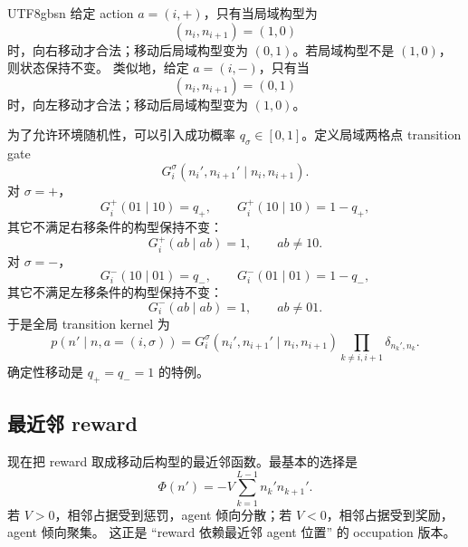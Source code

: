 \documentclass[11pt]{article}
\begin{document}
\begin{CJK*}{UTF8}{gbsn}
给定 action \(a=(i,+)\)，只有当局域构型为
\begin{equation}
    (n_i,n_{i+1})=(1,0)
\end{equation}
时，向右移动才合法；移动后局域构型变为 \((0,1)\)。若局域构型不是 \((1,0)\)，则状态保持不变。
类似地，给定 \(a=(i,-)\)，只有当
\begin{equation}
    (n_i,n_{i+1})=(0,1)
\end{equation}
时，向左移动才合法；移动后局域构型变为 \((1,0)\)。

为了允许环境随机性，可以引入成功概率 \(q_\sigma\in[0,1]\)。定义局域两格点 transition gate
\begin{equation}
    G_i^\sigma(n_i',n_{i+1}'\mid n_i,n_{i+1}).
\end{equation}
对 \(\sigma=+\)，
\begin{equation}
    G_i^+(01\mid 10)=q_+,
    \qquad
    G_i^+(10\mid 10)=1-q_+,
\end{equation}
其它不满足右移条件的构型保持不变：
\begin{equation}
    G_i^+(ab\mid ab)=1,
    \qquad
    ab\neq 10.
\end{equation}
对 \(\sigma=-\)，
\begin{equation}
    G_i^-(10\mid 01)=q_-,
    \qquad
    G_i^-(01\mid 01)=1-q_-,
\end{equation}
其它不满足左移条件的构型保持不变：
\begin{equation}
    G_i^-(ab\mid ab)=1,
    \qquad
    ab\neq 01.
\end{equation}
于是全局 transition kernel 为
\begin{equation}
    p(n'\mid n,a=(i,\sigma))
    =
    G_i^\sigma(n_i',n_{i+1}'\mid n_i,n_{i+1})
    \prod_{k\neq i,i+1}\delta_{n_k',n_k}.
    \label{eq:controlled-local-transition}
\end{equation}
确定性移动是 \(q_+=q_-=1\) 的特例。

\subsection{最近邻 reward}

现在把 reward 取成移动后构型的最近邻函数。最基本的选择是
\begin{equation}
    \Phi(n')
    =
    -V\sum_{k=1}^{L-1} n_k'n_{k+1}'.
    \label{eq:nn-potential}
\end{equation}
若 \(V>0\)，相邻占据受到惩罚，agent 倾向分散；若 \(V<0\)，相邻占据受到奖励，agent 倾向聚集。
这正是 ``reward 依赖最近邻 agent 位置'' 的 occupation 版本。


\end{CJK*}
\end{document}
